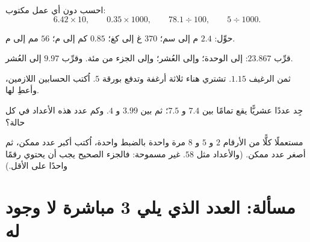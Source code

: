 \begin{exercise}[$\star$]\label{exo:g6:decimals:7}
احسب دون أي عمل مكتوب:
\[
6.42 \times 10, \qquad
0.35 \times 1000, \qquad
78.1 \div 100, \qquad
5 \div 1000 .
\]
\end{exercise}

\begin{exercise}[$\star$]\label{exo:g6:decimals:8}
حوِّل: $2.4$ م إلى سم؛ \quad $370$ غ إلى كغ؛ \quad $0.85$ كم إلى
م؛ \quad $56$ مم إلى م.
\end{exercise}

\begin{exercise}[$\star$]\label{exo:g6:decimals:9}
قرِّب $23.867$: إلى الوحدة؛ وإلى العُشر؛ وإلى الجزء من مئة. وقرِّب
$9.97$ إلى العُشر.
\end{exercise}

\begin{exercise}[$\star\star$]\label{exo:g6:decimals:10}
ثمن الرغيف $1.15$. تشتري هناء ثلاثة أرغفة وتدفع بورقة
$5$. اُكتب الحسابين اللازمين، وأعطِ  لها.
\end{exercise}

\begin{exercise}[$\star\star$]\label{exo:g6:decimals:11}
جِد عددًا عشريًّا يقع تمامًا بين $7.4$ و $7.5$؛ ثم بين
$3.99$ و $4$. وكم عدد هذه الأعداد في كل حالة؟
\end{exercise}

\begin{exercise}[$\star\star\star$]\label{exo:g6:decimals:12}
مستعملًا كلًّا من الأرقام $2$ و $5$ و $8$ مرة واحدة بالضبط  واحدة، اُكتب أكبر عدد ممكن، ثم أصغر عدد
ممكن. (والأعداد مثل $.58$ غير مسموحة: فالجزء الصحيح يجب أن يحتوي
رقمًا واحدًا على الأقل.)
\end{exercise}

\section{مسألة: العدد الذي يلي 3 مباشرة لا وجود له}

